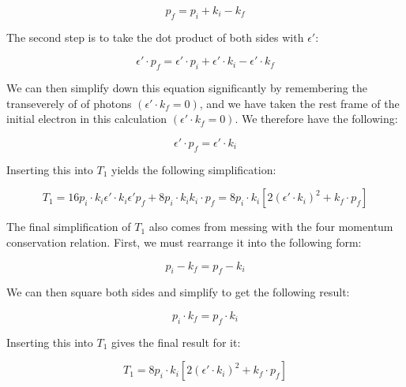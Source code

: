 \documentclass[a4]{article}
\begin{document}
    \begin{equation}
        p_f = p_i + k_i - k_f
    \end{equation}

    The second step is to take the dot product of both sides with $\epsilon'$:

    \begin{equation}
        \epsilon' \cdot p_f = \epsilon' \cdot p_i + \epsilon' \cdot k_i - \epsilon' \cdot k_f
    \end{equation}

    We can then simplify down this equation significantly by remembering the transeverely of of photons $(\epsilon' \cdot k_f = 0)$, and we have taken the rest frame of the initial
    electron in this calculation $(\epsilon' \cdot k_f = 0)$. We therefore have the following:

    \begin{equation}
        \epsilon' \cdot p_f = \epsilon' \cdot k_i
    \end{equation}

    Inserting this into $T_1$ yields the following simplification:

    \begin{equation}
        T_1 = 16 p_i \cdot k_i \epsilon' \cdot k_i \epsilon' p_f + 8 p_i \cdot k_i k_i \cdot p_f = 8 p_i \cdot k_i [2 (\epsilon' \cdot k_i)^2 + k_f \cdot p_f]
    \end{equation}

    The final simplification of $T_1$ also comes from messing with the four momentum conservation relation. First, we must rearrange it into the following form:

    \begin{equation}
        p_i - k_f = p_f - k_i
    \end{equation}

    We can then square both sides and simplify to get the following result:

    \begin{equation}
        p_i \cdot k_f = p_f \cdot k_i
    \end{equation}

    Inserting this into $T_1$ gives the final result for it:

    \begin{framed}
        \begin{equation}
            T_1 = 8 p_i \cdot k_i [2 (\epsilon' \cdot k_i)^2 + k_f \cdot p_f]
        \end{equation}
    \end{framed}
\end{document}
